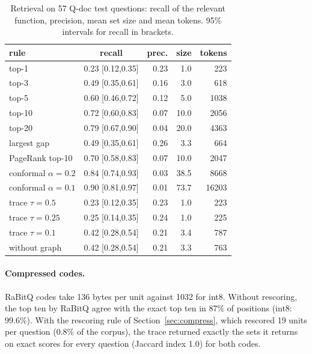 \documentclass[10pt,twocolumn]{article}
\theoremstyle{definition}
\theoremstyle{remark}
\begin{document}
\begin{table}[t]\centering\small
\caption{Retrieval on 57 Q-doc test questions: recall of the relevant function, precision, mean set size and mean tokens. 95\% intervals for recall in brackets.}\label{tab:retrieval}
\begin{tabular}{lcrrr}\toprule
rule & recall & prec. & size & tokens \\\midrule
top-1 & 0.23 {\scriptsize[0.12,0.35]} & 0.23 & 1.0 & 223 \\
top-3 & 0.49 {\scriptsize[0.35,0.61]} & 0.16 & 3.0 & 618 \\
top-5 & 0.60 {\scriptsize[0.46,0.72]} & 0.12 & 5.0 & 1038 \\
top-10 & 0.72 {\scriptsize[0.60,0.83]} & 0.07 & 10.0 & 2056 \\
top-20 & 0.79 {\scriptsize[0.67,0.90]} & 0.04 & 20.0 & 4363 \\
largest gap & 0.49 {\scriptsize[0.35,0.61]} & 0.26 & 3.3 & 664 \\
PageRank top-10 & 0.70 {\scriptsize[0.58,0.83]} & 0.07 & 10.0 & 2047 \\
conformal $\alpha{=}0.2$ & 0.84 {\scriptsize[0.74,0.93]} & 0.03 & 38.5 & 8668 \\
conformal $\alpha{=}0.1$ & 0.90 {\scriptsize[0.81,0.97]} & 0.01 & 73.7 & 16203 \\
trace $\tau{=}0.5$ & 0.23 {\scriptsize[0.12,0.35]} & 0.23 & 1.0 & 223 \\
trace $\tau{=}0.25$ & 0.25 {\scriptsize[0.14,0.35]} & 0.24 & 1.0 & 225 \\
trace $\tau{=}0.1$ & 0.42 {\scriptsize[0.28,0.54]} & 0.21 & 3.4 & 787 \\
\quad without graph & 0.42 {\scriptsize[0.28,0.54]} & 0.21 & 3.3 & 763 \\\bottomrule
\end{tabular}
\end{table}

\paragraph{Compressed codes.}
RaBitQ codes take 136 bytes per unit against 1032 for int8.
Without rescoring, the top ten by RaBitQ agree with the exact top ten in 87\% of positions (int8: 99.6\%).
With the rescoring rule of Section~\ref{sec:compress}, which rescored 19 units per question (0.8\% of the corpus), the trace returned exactly the sets it returns on exact scores for every question (Jaccard index 1.0) for both codes.
\end{document}
